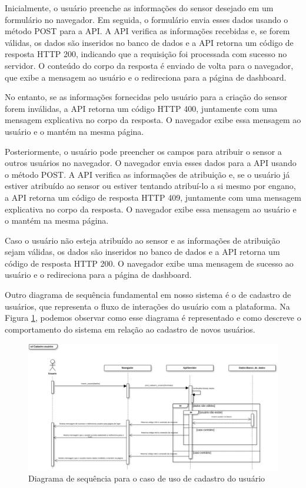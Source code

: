 \documentclass[tcc,capa]{texufpel}
\begin{document}
Inicialmente, o usuário preenche as informações do sensor desejado em um formulário no navegador. Em seguida, o formulário envia esses dados usando o método POST para a API. A API verifica as informações recebidas e, se forem válidas, os dados são inseridos no banco de dados e a API retorna um código de resposta HTTP 200, indicando que a requisição foi processada com sucesso no servidor. O conteúdo do corpo da resposta é enviado de volta para o navegador, que exibe a mensagem ao usuário e o redireciona para a página de dashboard.

No entanto, se as informações fornecidas pelo usuário para a criação do sensor forem inválidas, a API retorna um código HTTP 400, juntamente com uma mensagem explicativa no corpo da resposta. O navegador exibe essa mensagem ao usuário e o mantém na mesma página.

Posteriormente, o usuário pode preencher os campos para atribuir o sensor a outros usuários no navegador. O navegador envia esses dados para a API usando o método POST. A API verifica as informações de atribuição e, se o usuário já estiver atribuído ao sensor ou estiver tentando atribuí-lo a si mesmo por engano, a API retorna um código de resposta HTTP 409, juntamente com uma mensagem explicativa no corpo da resposta. O navegador exibe essa mensagem ao usuário e o mantém na mesma página.

Caso o usuário não esteja atribuído ao sensor e as informações de atribuição sejam válidas, os dados são inseridos no banco de dados e a API retorna um código de resposta HTTP 200. O navegador exibe uma mensagem de sucesso ao usuário e o redireciona para a página de dashboard.

Outro diagrama de sequência fundamental em nosso sistema é o de cadastro de usuários, que representa o fluxo de interações do usuário com a plataforma. Na Figura \ref{sdcadastro}, podemos observar como esse diagrama é representado e como descreve o comportamento do sistema em relação ao cadastro de novos usuários.

\begin{figure}[htbp]
  \centering \includegraphics[scale=.3]{assets/sdcadastro.png}
  \caption{Diagrama de sequência para o caso de uso de cadastro do usuário}
  \label{sdcadastro}
\end{figure}
\end{document}
